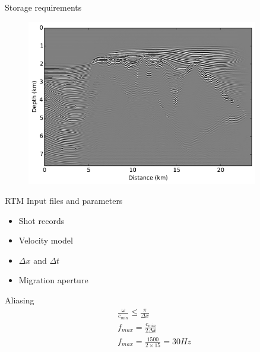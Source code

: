 \documentclass[xcolor=dvipsnames,notes]{beamer}
\begin{document}
\begin{frame}{Storage requirements}
\begin{figure}
\includegraphics[width=0.9\textwidth]{Fig/mig.pdf}
\end{figure}
\end{frame}
\begin{frame}{RTM Input files and parameters}
\begin{itemize}
\item Shot records
\item Velocity model
\item $\Delta x$ and $\Delta t$
\item Migration aperture
\end{itemize}
Aliasing
\begin{eqnarray}
\frac{\omega}{c_{min}} \le \frac{\pi}{\Delta x} \\
f_{max} = \frac{c_{min}}{2\Delta x}\\
f_{max} = \frac{1500}{2\times 15} = 30Hz
\end{eqnarray}
\end{frame}
\end{document}
